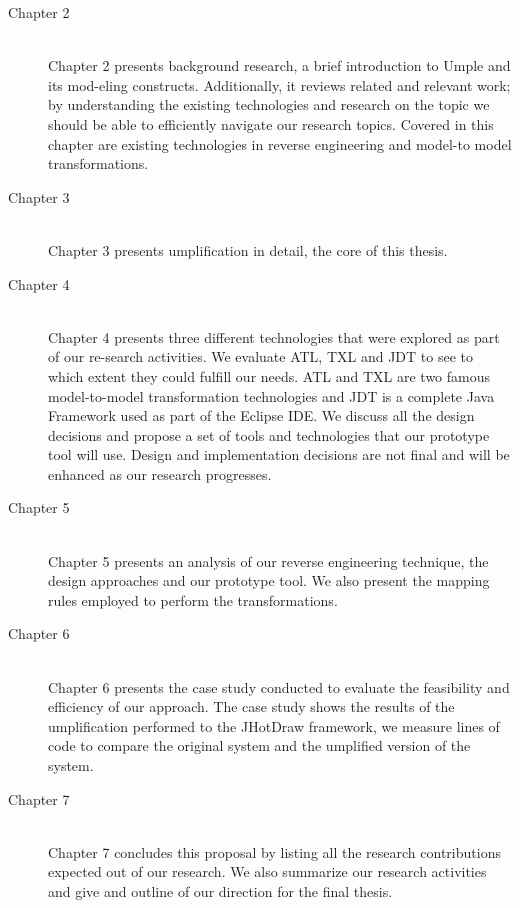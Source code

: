 \begin{description}
  \item[Chapter 2] \hfill \\
Chapter 2 presents background research, a brief introduction to Umple and its mod-eling constructs. Additionally, it reviews related and relevant work; by understanding the existing technologies and research on the topic we should be able to efficiently navigate our research topics.  Covered in this chapter are existing technologies in reverse engineering and model-to model transformations. 
  \item[Chapter 3] \hfill \\
Chapter 3 presents umplification in detail, the core of this thesis. 
  \item[Chapter 4] \hfill \\
Chapter 4 presents three different technologies that were explored as part of our re-search activities. We evaluate ATL, TXL and JDT to see to which extent they could fulfill our needs. ATL and TXL are two famous model-to-model transformation technologies and JDT is a complete Java Framework used as part of the Eclipse IDE. We discuss all the design decisions and propose a set of tools and technologies that our prototype tool will use. Design and implementation decisions are not final and will be enhanced as our research progresses.
    \item[Chapter 5] \hfill \\
Chapter 5 presents an analysis of our reverse engineering technique, the design approaches and our prototype tool. We also present the mapping rules employed to perform the transformations.    
    \item[Chapter 6] \hfill \\
Chapter 6 presents the case study conducted to evaluate the feasibility and efficiency of our approach. The case study shows the results of the umplification performed to the JHotDraw framework, we measure lines of code to compare the original system and the umplified version of the system. 
    \item[Chapter 7] \hfill \\
Chapter 7 concludes this proposal by listing all the research contributions expected out of our research. We also summarize our research activities and give and outline of our direction for the final thesis.
\end{description}


